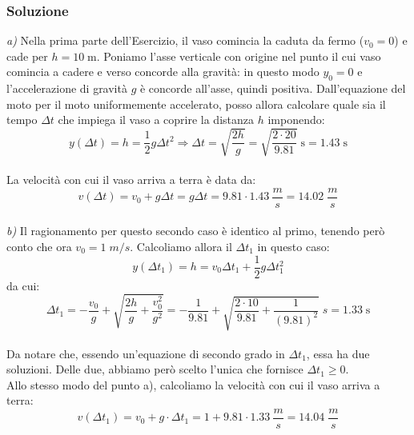 \documentclass[12pt,a4paper]{book}
\begin{document}
\subsubsection*{Soluzione}
\emph{a)} Nella prima parte dell'Esercizio, il vaso comincia la caduta da fermo ($v_0 = 0$) e cade per $h=10 \;$m. Poniamo l'asse verticale con origine nel punto il cui vaso comincia a cadere e verso concorde alla gravità: in questo modo $y_0=0$ e l'accelerazione di gravità $g$ è concorde all'asse, quindi positiva. Dall'equazione del moto per il moto uniformemente accelerato, posso allora calcolare quale sia il tempo $\Delta t$ che impiega il vaso a coprire la distanza $h$ imponendo:\\
\begin{equation*}
y(\Delta t) = h = \frac{1}{2} g\Delta t ^2 \Longrightarrow \Delta t = \sqrt{\frac{2 h}{g}}= \sqrt{\frac{2\cdot 20}{9.81}} \; \text{s} = 1.43 \; \text{s} 
\end{equation*}\\
La velocità con cui il vaso arriva a terra è data da:\\
\begin{equation*}
v(\Delta t) = v_0 + g\Delta t = g\Delta t = 9.81 \cdot 1.43 \: \frac{m}{s} = 14.02 \; \frac{m}{s}
\end{equation*}\\

\emph{b)} Il ragionamento per questo secondo caso è identico al primo, tenendo però conto che ora $v_0 = 1 \; m/s$. Calcoliamo allora il $\Delta t_1$ in questo caso:\\
\begin{equation*}
y(\Delta t_1) = h = v_0 \Delta t_1 + \frac{1}{2} g \Delta t_1 ^2 
\end{equation*}
da cui:
\begin{equation*}
\Delta t_1 = -\frac{v_0}{g} + \sqrt{\frac{2 h}{g}+\frac{v_0^2}{g^2}}= -\frac{1}{9.81} + \sqrt{\frac{2 \cdot 10}{9.81}+\frac{1}{(9.81)^2}} \; s = 1.33 \; \text{s} 
\end{equation*}\\
Da notare che, essendo un'equazione di secondo grado in $\Delta t_1$, essa ha due soluzioni. Delle due, abbiamo però scelto l'unica che fornisce $\Delta t_1 \geq 0$.\\
Allo stesso modo del punto a), calcoliamo la velocità con cui il vaso arriva a terra:\\
\begin{equation*}
v(\Delta t_1) = v_0 + g\cdot \Delta t_1 = 1 + 9.81 \cdot 1.33 \: \frac{m}{s} = 14.04 \; \frac{m}{s}
\end{equation*}\\
\end{document}
